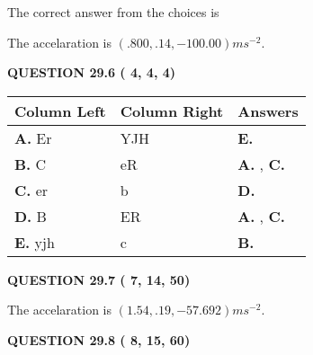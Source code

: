 \documentclass[12pt]{article}
\begin{document}
The correct answer from the choices is


The accelaration is $  %
(
.800,
.14,
-100.00)
ms^{-2} $.
 
 
 
  
\vspace{0.2in}
  
{\textbf{\Large{QUESTION
29.6 
 (          4,          4,          4)
}}}
  
  
 
 
\noindent{}
  
  
\begin{tabular}{|l|l|l|}
 \hline
 Column Left & Column Right  & Answers       \\ 
 \hline
{\textbf{\large{
A.}}}
Er
  & 
YJH
 & 
{\textbf{\large{
E.}}}
 \\ 
 \hline
{\textbf{\large{
B.}}}
C
  & 
eR
 & 
{\textbf{\large{
A.}}}
, 
{\textbf{\large{
C.}}}
 \\ 
 \hline
{\textbf{\large{
C.}}}
er
  & 
b
 & 
{\textbf{\large{
D.}}}
 \\ 
 \hline
{\textbf{\large{
D.}}}
B
  & 
ER
 & 
{\textbf{\large{
A.}}}
, 
{\textbf{\large{
C.}}}
 \\ 
 \hline
{\textbf{\large{
E.}}}
yjh
  & 
c
 & 
{\textbf{\large{
B.}}}
 \\ 
 \hline
 \end{tabular}
  
  
 
 
 
 
  
\vspace{0.2in}
  
{\textbf{\Large{QUESTION
29.7 
 (          7,         14,         50)
}}}
  
  
 
 
\noindent{}
 
 
  The accelaration is $  %
(
1.54,
.19,
-57.692)
ms^{-2} $.
 
 
 
 
  
\vspace{0.2in}
  
{\textbf{\Large{QUESTION
29.8 
 (          8,         15,         60)
}}}
  
  
 
 
\noindent{}
\end{document}
